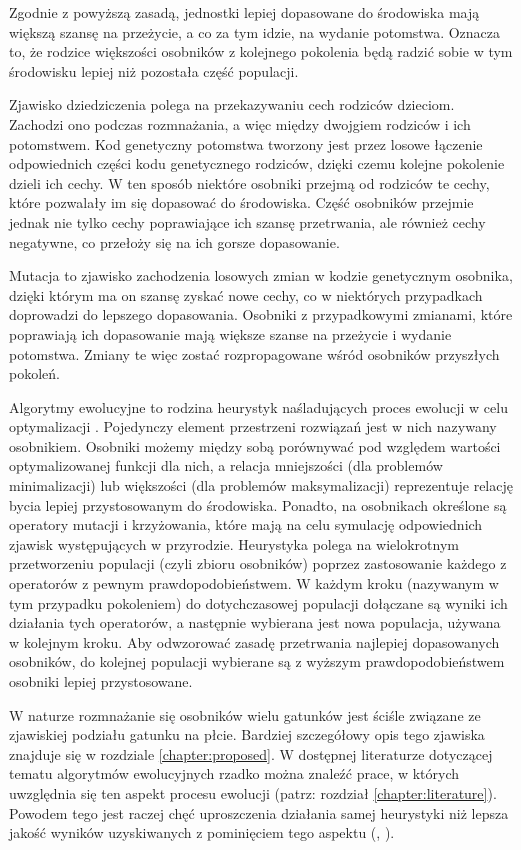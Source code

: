 \documentclass[./FM_mgr.tex]{subfiles}
\begin{document}
Zgodnie z powyższą zasadą, jednostki lepiej dopasowane do środowiska mają większą szansę na przeżycie, a co za tym idzie, na wydanie potomstwa.
Oznacza to, że rodzice większości osobników z kolejnego pokolenia będą radzić sobie w tym środowisku lepiej niż pozostała część populacji.

Zjawisko dziedziczenia polega na przekazywaniu cech rodziców dzieciom. 
Zachodzi ono podczas rozmnażania, a więc między dwojgiem rodziców i ich potomstwem. 
Kod genetyczny potomstwa tworzony jest przez losowe łączenie odpowiednich części kodu genetycznego rodziców, dzięki czemu kolejne pokolenie dzieli ich cechy. 
W ten sposób niektóre osobniki przejmą od rodziców te cechy, które pozwalały im się dopasować do środowiska.
Część osobników przejmie jednak nie tylko cechy poprawiające ich szansę przetrwania, ale również cechy negatywne, co przełoży się na ich gorsze dopasowanie.

Mutacja to zjawisko zachodzenia losowych zmian w kodzie genetycznym osobnika, dzięki którym ma on szansę zyskać nowe cechy, co w niektórych przypadkach doprowadzi do lepszego dopasowania.
Osobniki z przypadkowymi zmianami, które poprawiają ich dopasowanie mają większe szanse na przeżycie i wydanie potomstwa.
Zmiany te więc zostać rozpropagowane wśród osobników przyszłych pokoleń.

Algorytmy ewolucyjne to rodzina heurystyk naśladujących proces ewolucji w celu optymalizacji \cite{davis1991handbook}. 
Pojedynczy element przestrzeni rozwiązań jest w nich nazywany osobnikiem. 
Osobniki możemy między sobą porównywać pod względem wartości optymalizowanej funkcji dla nich, a relacja mniejszości (dla problemów minimalizacji) lub większości (dla problemów maksymalizacji) reprezentuje relację bycia lepiej przystosowanym do środowiska. 
Ponadto, na osobnikach określone są operatory mutacji i krzyżowania, które mają na celu symulację odpowiednich zjawisk występujących w przyrodzie. 
Heurystyka polega na wielokrotnym przetworzeniu populacji (czyli zbioru osobników) poprzez zastosowanie każdego z operatorów z pewnym prawdopodobieństwem. 
W każdym kroku (nazywanym w tym przypadku pokoleniem) do dotychczasowej populacji dołączane są wyniki ich działania tych operatorów, a następnie wybierana jest nowa populacja, używana w kolejnym kroku. 
Aby odwzorować zasadę przetrwania najlepiej dopasowanych osobników, do kolejnej populacji wybierane są z wyższym prawdopodobieństwem osobniki lepiej przystosowane.

W naturze rozmnażanie się osobników wielu gatunków jest ściśle związane ze zjawiskiej podziału gatunku na płcie. 
Bardziej szczegółowy opis tego zjawiska znajduje się w rozdziale \ref{chapter:proposed}. 
W dostępnej literaturze dotyczącej tematu algorytmów ewolucyjnych rzadko można znaleźć prace, w których uwzględnia się ten aspekt procesu ewolucji (patrz: rozdział \ref{chapter:literature}). 
Powodem tego jest raczej chęć uproszczenia działania samej heurystyki niż lepsza jakość wyników uzyskiwanych z pominięciem tego aspektu (\cite{GGA}, \cite{SexualGA}). 
\end{document}
